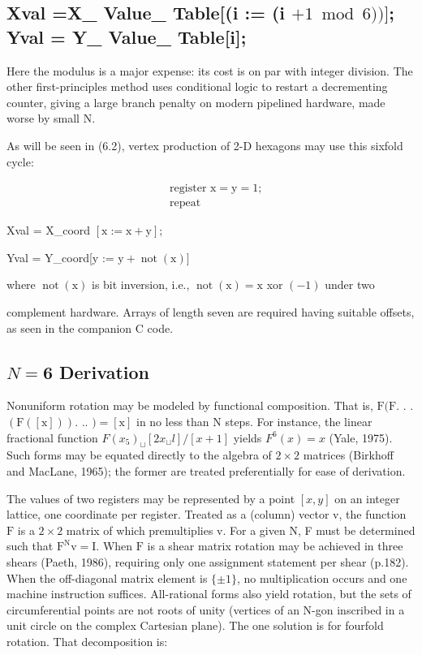 \begin{CJK}{UTF8}{gbsn}
\section{Xval =X\_ Value\_ Table[(i := (i $+1 \bmod 6))]$; 
 Yval = Y\_ Value\_ Table[i];}
Here the modulus is a major expense: its cost is on par with integer division. The other first-principles method uses conditional logic to restart a decrementing counter, giving a large branch penalty on modern pipelined hardware, made worse by small N.

As will be seen in (6.2), vertex production of 2-D hexagons may use this sixfold cycle:

$$
\begin{aligned}
&\text { register } \mathrm{x}=\mathrm{y}=1 \text {; } \\
&\text { repeat }
\end{aligned}
$$

Xval = X\_coord $[\mathrm{x}:=\mathrm{x}+\mathrm{y}] ;$

Yval = Y\_coord[y := $\mathrm{y}+\operatorname{not}(\mathrm{x})]$

where $\operatorname{not}(\mathrm{x})$ is bit inversion, i.e., $\operatorname{not}(\mathrm{x})=\mathrm{x}$ xor $(-1)$ under two

complement hardware. Arrays of length seven are required having suitable offsets, as seen in the companion C code.

\subsection*{$N=\mathbf{6}$ Derivation}
Nonuniform rotation may be modeled by functional composition. That is, $\mathrm{F}(\mathrm{F}$. . . $(\mathrm{F}([\mathrm{x}]))$. .. $)=[\mathrm{x}]$ in no less than $\mathrm{N}$ steps. For instance, the linear fractional function $F\left(x_{5}\right)_{\sqcup}\left[2 x_{\sqcup} l\right] /[x+1]$ yields $F^{6}(x)=x$ (Yale, 1975). Such forms may be equated directly to the algebra of $2 \times 2$ matrices (Birkhoff and MacLane, 1965); the former are treated preferentially for ease of derivation.

The values of two registers may be represented by a point $[x, y]$ on an integer lattice, one coordinate per register. Treated as a (column) vector $\mathrm{v}$, the function $\mathrm{F}$ is a $2 \times 2$ matrix of which premultiplies $\mathrm{v}$. For a given $\mathrm{N}$, F must be determined such that $\mathrm{F}^{\mathrm{N}} \mathrm{v}=\mathrm{I}$. When $\mathrm{F}$ is a shear matrix rotation may be achieved in three shears (Paeth, 1986), requiring only one assignment statement per shear (p.182). When the off-diagonal matrix element is $\{\pm 1\}$, no multiplication occurs and one machine instruction suffices. All-rational forms also yield rotation, but the sets of circumferential points are not roots of unity (vertices of an $\mathrm{N}$-gon inscribed in a unit circle on the complex Cartesian plane). The one solution is for fourfold rotation. That decomposition is:


\end{CJK}
